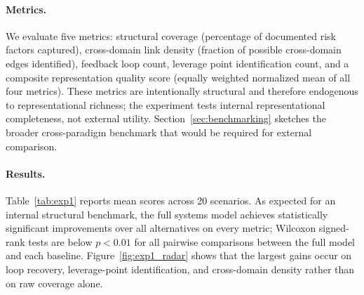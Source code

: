 \documentclass[11pt]{article}
\begin{document}
\paragraph{Metrics.} We evaluate five metrics: structural coverage (percentage of documented risk factors captured), cross-domain link density (fraction of possible cross-domain edges identified), feedback loop count, leverage point identification count, and a composite representation quality score (equally weighted normalized mean of all four metrics). These metrics are intentionally structural and therefore endogenous to representational richness; the experiment tests internal representational completeness, not external utility. Section~\ref{sec:benchmarking} sketches the broader cross-paradigm benchmark that would be required for external comparison.

\paragraph{Results.} Table~\ref{tab:exp1} reports mean scores across 20 scenarios. As expected for an internal structural benchmark, the full systems model achieves statistically significant improvements over all alternatives on every metric; Wilcoxon signed-rank tests are below $p < 0.01$ for all pairwise comparisons between the full model and each baseline. Figure~\ref{fig:exp1_radar} shows that the largest gains occur on loop recovery, leverage-point identification, and cross-domain density rather than on raw coverage alone.

\begin{table}[t]
\centering
\caption{Experiment 1: Internal representation metrics across five methods (mean $\pm$ SD over 20 scenarios). Bold indicates best. All differences between the full systems model and other methods are significant at $p < 0.01$ (Wilcoxon signed-rank test).}
\label{tab:exp1}
\small
{}
\end{table}
\end{document}
